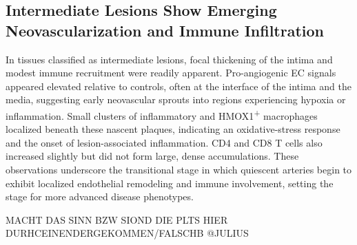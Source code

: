 \documentclass[a4paper,12pt]{article}
\begin{document}
\subsection{Intermediate Lesions Show Emerging Neovascularization and Immune Infiltration}
In tissues classified as intermediate lesions, focal thickening of the intima and modest immune recruitment were readily apparent. Pro-angiogenic EC signals appeared elevated relative to controls, often at the interface of the intima and the media, suggesting early neovascular sprouts into regions experiencing hypoxia or inflammation. Small clusters of inflammatory and HMOX1\textsuperscript{+} macrophages localized beneath these nascent plaques, indicating an oxidative-stress response and the onset of lesion-associated inflammation. CD4 and CD8 T cells also increased slightly but did not form large, dense accumulations. These observations underscore the transitional stage in which quiescent arteries begin to exhibit localized endothelial remodeling and immune involvement, setting the stage for more advanced disease phenotypes.

MACHT DAS SINN BZW SIOND DIE PLTS HIER DURHCEINENDERGEKOMMEN/FALSCHB @JULIUS
\end{document}
